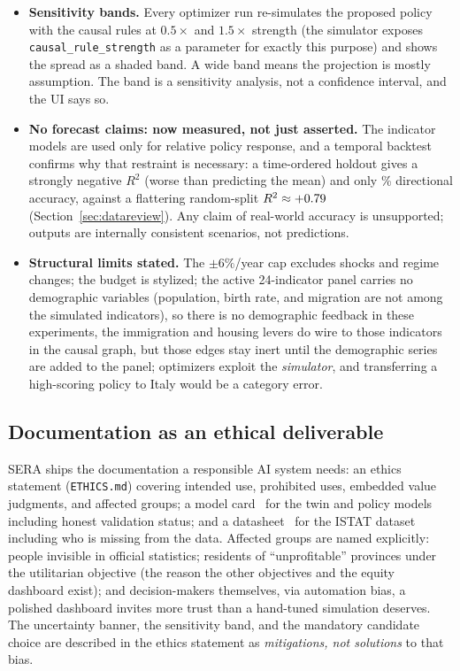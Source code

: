\documentclass[11pt,a4paper]{article}
\newcommand{\code}[1]{\texttt{#1}}
\begin{document}
\begin{itemize}
    \item \textbf{Sensitivity bands.} Every optimizer run re-simulates the
    proposed policy with the causal rules at $0.5\times$ and $1.5\times$
    strength (the simulator exposes \code{causal\_rule\_strength} as a
    parameter for exactly this purpose) and shows the spread as a shaded band.
    A wide band means the projection is mostly assumption. The band is a
    sensitivity analysis, not a confidence interval, and the UI says so.
    \item \textbf{No forecast claims: now measured, not just asserted.} The
    indicator models are used only for relative policy response, and a temporal
    backtest confirms why that restraint is necessary: a time-ordered holdout
    gives a strongly negative $R^2$ (worse than predicting the mean) and only
    \strDirAcc\% directional accuracy, against a flattering random-split
    $R^2 \approx +0.79{}$ (Section~\ref{sec:datareview}). Any claim of
    real-world accuracy is unsupported; outputs are internally consistent
    scenarios, not predictions.
    \item \textbf{Structural limits stated.} The $\pm6\%$/year cap excludes
    shocks and regime changes; the budget is stylized; the active
    24-indicator panel carries no demographic variables (population, birth
    rate, and migration are not among the simulated indicators), so there is
    no demographic feedback in these experiments, the immigration and
    housing levers do wire to those indicators in the causal graph, but those
    edges stay inert until the demographic series are added to the panel;
    optimizers exploit the \emph{simulator}, and transferring a high-scoring
    policy to Italy would be a category error.
\end{itemize}

\subsection{Documentation as an ethical deliverable}
\label{sec:docs}

SERA ships the documentation a responsible AI system needs: an ethics statement
(\code{ETHICS.md}) covering intended use, prohibited uses, embedded value
judgments, and affected groups; a model card~\cite{mitchell2019} for the twin
and policy models including honest validation status; and a
datasheet~\cite{gebru2021} for the ISTAT dataset including who is missing from
the data. Affected groups are named explicitly: people invisible in official
statistics; residents of ``unprofitable'' provinces under the utilitarian
objective (the reason the other objectives and the equity dashboard exist); and
decision-makers themselves, via automation bias, a polished dashboard
invites more trust than a hand-tuned simulation deserves. The uncertainty
banner, the sensitivity band, and the mandatory candidate choice are described
in the ethics statement as \emph{mitigations, not solutions} to that bias.
\end{document}
